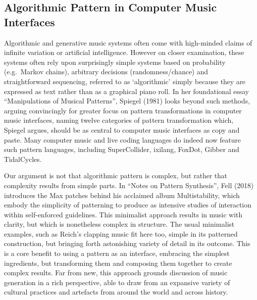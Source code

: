 \documentclass{nime-alternate} %
\begin{document}
\hypertarget{algorithmic-pattern-in-computer-music-interfaces}{%
\subsection{Algorithmic Pattern in Computer Music
Interfaces}\label{algorithmic-pattern-in-computer-music-interfaces}}

Algorithmic and generative music systems often come with high-minded
claims of infinite variation or artificial intelligence. However on
closer examination, these systems often rely upon surprisingly simple
systems based on probability (e.g.~Markov chains), arbitrary decisions
(randomness/chance) and straightforward sequencing, referred to as
`algorithmic' simply because they are expressed as text rather than as a
graphical piano roll. In her foundational essay ``Manipulations of
Musical Patterns'', Spiegel (1981) looks beyond such methods, arguing
convincingly for greater focus on pattern transformations in computer
music interfaces, naming twelve categories of pattern transformation
which, Spiegel argues, should be as central to computer music interfaces
as copy and paste. Many computer music and live coding languages do
indeed now feature such pattern languages, including SuperCollider,
ixilang, FoxDot, Gibber and TidalCycles.

Our argument is not that algorithmic pattern is complex, but rather that
complexity results from simple parts. In ``Notes on Pattern Synthesis'',
Fell (2018) introduces the Max patches behind his acclaimed album
Multistability, which embody the simplicity of patterning to produce as
intensive studies of interaction within self-enforced guidelines. This
minimalist approach results in music with clarity, but which is
nonetheless complex in structure. The usual minimalist examples, such as
Reich's clapping music fit here too, simple in its patterned
construction, but bringing forth astonishing variety of detail in its
outcome. This is a core benefit to using a pattern as an interface,
embracing the simplest ingredients, but transforming them and composing
them together to create complex results. Far from new, this approach
grounds discussion of music generation in a rich perspective, able to
draw from an expansive variety of cultural practices and artefacts from
around the world and across history.
\end{document}
